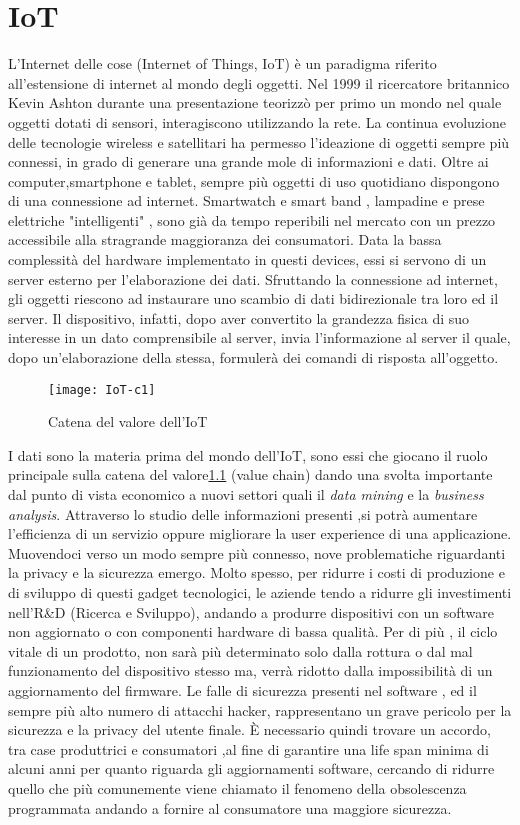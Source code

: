 \chapter{IoT}
L'Internet delle cose (Internet of Things, IoT) è un paradigma riferito
all’estensione di internet al mondo degli oggetti. Nel 1999 il ricercatore
britannico Kevin Ashton durante una presentazione teorizzò  per primo un mondo
nel quale oggetti dotati di sensori, interagiscono utilizzando la rete.  La
continua evoluzione delle tecnologie wireless e satellitari ha permesso
l'ideazione di oggetti sempre più connessi, in grado di generare una grande mole
di informazioni e dati. Oltre ai computer,smartphone e tablet, sempre più
oggetti di uso quotidiano dispongono di una connessione ad internet. Smartwatch
e smart band , lampadine e prese elettriche "intelligenti" ,  sono già da tempo
reperibili nel mercato con un prezzo accessibile alla stragrande maggioranza dei
consumatori.  Data la bassa
complessità del hardware implementato in questi devices, essi si servono di
 un server esterno per l'elaborazione dei dati.  Sfruttando la
connessione ad internet, gli oggetti riescono ad instaurare uno scambio di dati
bidirezionale tra loro ed il server. Il dispositivo, infatti,  dopo aver
convertito la grandezza fisica di suo interesse in un dato comprensibile al
server, invia l'informazione al server il quale, dopo un'elaborazione della
stessa, formulerà dei comandi di risposta all'oggetto.
\\
\begin{figure}[h]
        \centering 
                \texttt{[image: IoT-c1]}
        \caption{Catena del valore dell'IoT}
        \label{fig:IoT_chain}
\end{figure}
I dati sono la materia prima del mondo dell'IoT, sono essi che giocano il ruolo
principale sulla catena del valore\ref{fig:IoT_chain} (value chain) dando una svolta importante dal
punto di vista economico a nuovi settori quali il \emph{data mining} e la
\emph{business analysis}.
Attraverso lo studio delle informazioni presenti ,si potrà  aumentare l’efficienza di un
servizio oppure  migliorare la user experience di una applicazione.
Muovendoci verso un modo sempre più connesso, nove problematiche riguardanti la
privacy e la sicurezza emergo.  Molto spesso, per ridurre i costi di produzione e
di sviluppo di questi gadget tecnologici, le aziende tendo a ridurre gli
investimenti nell'R\&D (Ricerca e Sviluppo), andando a produrre dispositivi con
un software non aggiornato o con componenti hardware di bassa qualità. Per di
più , il ciclo vitale di un prodotto, non sarà più determinato solo dalla
rottura o dal mal funzionamento del dispositivo stesso ma, verrà ridotto dalla
impossibilità di un aggiornamento del firmware.
Le falle di sicurezza presenti nel software , ed il sempre più alto numero di
attacchi hacker, rappresentano un grave  pericolo per la sicurezza e la privacy del utente
finale.
È necessario quindi trovare un accordo, tra case produttrici e
consumatori ,al fine di garantire una life span minima di alcuni anni per quanto
riguarda gli aggiornamenti software, cercando di ridurre quello che più comunemente
viene chiamato il fenomeno della obsolescenza programmata andando a fornire al
consumatore una  maggiore sicurezza.
